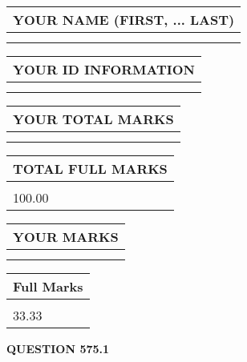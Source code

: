 \documentclass{ctexart}
\begin{document}
   
   
   
\newpage 
\setcounter{page}{ 
   575001 } 
   
   
   
   
\noindent\begin{tabular}{|l|}
\hline
YOUR NAME (FIRST, ... LAST)  \\
\hline
 \\ 
 \\ 
\hline
\end{tabular}
\hspace{0.05in} \begin{tabular}{|l|}
\hline
 YOUR   ID   INFORMATION  \\
\hline
 \\ 
 \\ 
\hline
\end{tabular}
   
   
\vspace{0.2in}\noindent\begin{tabular}{|l|}
\hline
YOUR TOTAL MARKS  \\
\hline
 \\ 
 \\ 
\hline
\end{tabular}
\hspace{0.05in} \begin{tabular}{|l|}
\hline
TOTAL FULL MARKS  \\
\hline
 \\ 
100.00 \\
\hline
\end{tabular}
   
   
 \vspace{0.2in}
 
 
 
 
   
   
  
\vspace{0.2in}
  
\noindent\begin{tabular}{|l|}
\hline
 YOUR MARKS  \\
\hline
 \\ 
 \\ 
\hline
\end{tabular}
\hspace{0.05in} \begin{tabular}{|l|}
\hline
 Full Marks  \\
\hline
 \\ 
33.33 \\
\hline
\end{tabular}
{\textbf{\Large{QUESTION
575.1 
}}}
  
\end{document}
